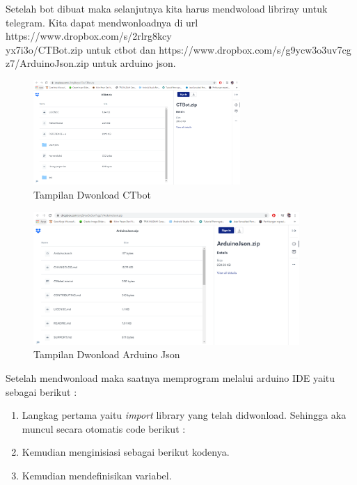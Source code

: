 \begin{enumerate}
 \par Setelah bot dibuat maka selanjutnya kita harus mendwoload libriray untuk telegram. Kita dapat mendwonloadnya di url https://www.dropbox.com/s/2rlrg8kcy\\yx7i3o/CTBot.zip untuk ctbot dan https://www.dropbox.com/s/g9ycw3o3uv7cg\\z7/ArduinoJson.zip untuk arduino json.
   \begin{figure}[H]
    \centering
    \includegraphics[width=0.7\textwidth]{figures/bot9.png}
    \caption{Tampilan Dwonload CTbot}
    \label{print}
    \end{figure}
        
    \begin{figure}[H]
    \centering
    \includegraphics[width=0.9\textwidth]{figures/bot10.png}
    \caption{Tampilan Dwonload Arduino Json}
    \label{print}
    \end{figure}
    
    \par Setelah mendwonload maka saatnya memprogram melalui arduino IDE yaitu sebagai berikut :
    \begin{enumerate}
     \item Langkag pertama yaitu \textit{import} library yang telah didwonload. Sehingga aka muncul secara otomatis code berikut :
    
    \item Kemudian menginisiasi sebagai berikut kodenya. 
    
    \item Kemudian mendefinisikan variabel.
    
        

\end{enumerate}
\end{enumerate}
